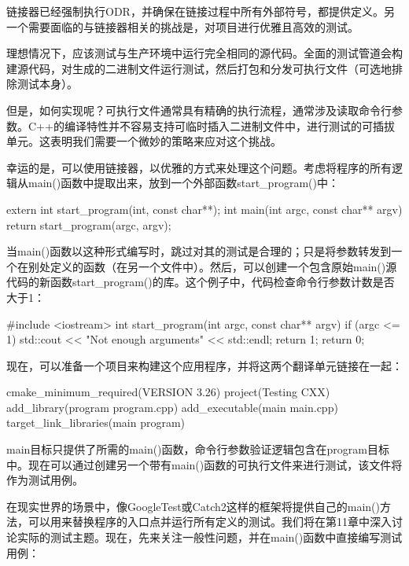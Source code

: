 链接器已经强制执行ODR，并确保在链接过程中所有外部符号，都提供定义。另一个需要面临的与链接器相关的挑战是，对项目进行优雅且高效的测试。

理想情况下，应该测试与生产环境中运行完全相同的源代码。全面的测试管道会构建源代码，对生成的二进制文件运行测试，然后打包和分发可执行文件（可选地排除测试本身）。

但是，如何实现呢？可执行文件通常具有精确的执行流程，通常涉及读取命令行参数。C++的编译特性并不容易支持可临时插入二进制文件中，进行测试的可插拔单元。这表明我们需要一个微妙的策略来应对这个挑战。

幸运的是，可以使用链接器，以优雅的方式来处理这个问题。考虑将程序的所有逻辑从main()函数中提取出来，放到一个外部函数start\_program()中：


\begin{cpp}
extern int start_program(int, const char**);
int main(int argc, const char** argv) {
    return start_program(argc, argv);
}
\end{cpp}

当main()函数以这种形式编写时，跳过对其的测试是合理的；只是将参数转发到一个在别处定义的函数（在另一个文件中）。然后，可以创建一个包含原始main()源代码的新函数start\_program()的库。这个例子中，代码检查命令行参数计数是否大于1：


\begin{cpp}
#include <iostream>
int start_program(int argc, const char** argv) {
    if (argc <= 1) {
        std::cout << "Not enough arguments" << std::endl;
        return 1;
    }
    return 0;
}
\end{cpp}

现在，可以准备一个项目来构建这个应用程序，并将这两个翻译单元链接在一起：


\begin{cmake}
cmake_minimum_required(VERSION 3.26)
project(Testing CXX)
add_library(program program.cpp)
add_executable(main main.cpp)
target_link_libraries(main program)
\end{cmake}

main目标只提供了所需的main()函数，命令行参数验证逻辑包含在program目标中。现在可以通过创建另一个带有main()函数的可执行文件来进行测试，该文件将作为测试用例。

在现实世界的场景中，像GoogleTest或Catch2这样的框架将提供自己的main()方法，可以用来替换程序的入口点并运行所有定义的测试。我们将在第11章中深入讨论实际的测试主题。现在，先来关注一般性问题，并在main()函数中直接编写测试用例：

